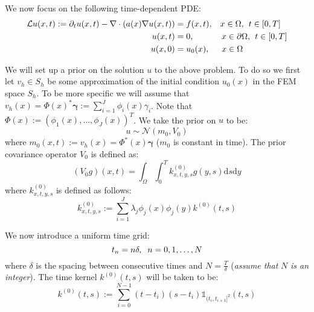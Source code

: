 \documentclass{article}
\theoremstyle{definition}
\theoremstyle{remark}
\theoremstyle{remark}
\begin{document}
\setlength\parskip{10pt}
\setlength\parindent{20pt}

\noindent We now focus on the following time-dependent PDE:
\begin{align}
        \mathcal{L}u(x,t) := \partial_{t}u(x,t) -\nabla\cdot(a(x)\nabla u(x,t))&=f(x,t), \hspace{0.3cm} x\in\Omega, \hspace{0.15cm} t\in[0,T] \\
        u(x,t) &= 0, \hspace{1.15cm} x\in\partial\Omega, \hspace{0.15cm} t\in[0,T] \\
        u(x,0) &= u_{0}(x), \hspace{0.5cm} x\in\Omega
\end{align}

\noindent We will set up a prior on the solution $u$ to the above problem. To do so we first let $v_{h}\in S_{h}$ be some approximation of the initial condition $u_{0}(x)$ in the FEM space $S_{h}$. To be more specific we will assume that $v_{h}(x)=\Phi(x)^{*}\boldsymbol{\gamma}:=\sum_{i=1}^{J}\phi_{i}(x)\gamma_{i}$. Note that $\Phi(x):=(\phi_{1}(x),\dots,\phi_{J}(x))^{T}$. We take the prior on $u$ to be:
\begin{equation}
    u\sim\mathcal{N}(m_{0},V_{0})
\end{equation}
where $m_{0}(x,t):=v_{h}(x)=\Phi^{*}(x)\boldsymbol{\gamma}$ ($m_{0}$ is constant in time). The prior covariance operator $V_{0}$ is defined as:
\begin{equation}
    (V_{0}g)(x,t)=\int_{\Omega}\int_{0}^{T}k_{x,t,y,s}^{(0)}g(y,s)\mathrm{d}s\mathrm{d}y
\end{equation}
where $k_{x,t,y,s}^{(0)}$ is defined as follows:
\begin{equation}
    k_{x,t,y,s}^{(0)}:=\sum_{i=1}^{J}\lambda_{j}\phi_{j}(x)\phi_{j}(y)k^{(0)}(t,s)
\end{equation}

\noindent We now introduce a uniform time grid:
\begin{equation*}
    t_{n}=n\delta, \hspace{0.2cm} n=0,1,\dots,N
\end{equation*}
where $\delta$ is the spacing between consecutive times and $N=\frac{T}{\delta}$ (\textit{assume that} $N$ \textit{is an integer}). The time kernel $k^{(0)}(t,s)$ will be taken to be:
\begin{equation}
    k^{(0)}(t,s):=\sum_{i=0}^{N-1}(t-t_{i})(s-t_{i})\mathbb{1}_{(t_{i},t_{i+1}]^{2}}(t,s)
\end{equation}
\end{document}
